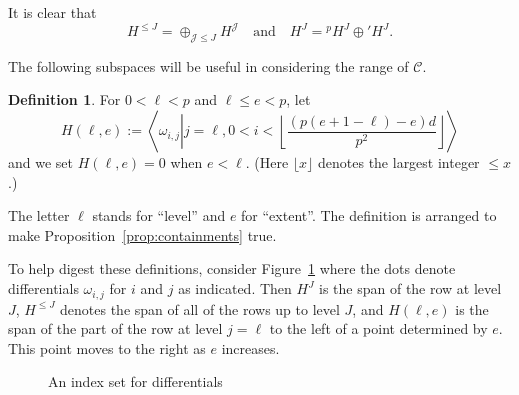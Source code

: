 \documentclass[12pt,reqno]{amsart}
\numberwithin{equation}{section}
\theoremstyle{plain}
\theoremstyle{definition}
\newtheorem{defn}[subsection]{Definition}
\theoremstyle{remark}
\numberwithin{equation}{section}
\newcommand{\CC}{\mathcal{C}}
\newcommand{\<}{\langle}
\renewcommand{\>}{\rangle}
\renewcommand{\and}{\quad\text{and}\quad}
\def\J{\mathcal{J}}
\def\HJ{H^J}
\def\HlJ{H^{\le J}}
\def\prH{{}'H^J}
\def\pH{{}^pH^J}
\begin{document}
It is clear that
\[\HlJ=\oplus_{\J\le J}H^{\J}\and \HJ=\pH\oplus\prH.\]

The following subspaces will be useful in considering the range of
$\CC$.

\begin{defn}\label{def:H(l,e)}
  For $0<\ell<p$ and $\ell\le e<p$, let
\[  H(\ell,e):=\left\<\omega_{i,j}\left|j=\ell,
      0<i<\left\lfloor\frac{(p(e+1-\ell)-e)d}{p^2}\right\rfloor
    \right.\right\>\]
and we set  $H(\ell,e)=0$ when $e<\ell$.   (Here $\lfloor x\rfloor$
denotes the largest integer $\le x$.)
\end{defn}

The letter $\ell$ stands for ``level'' and $e$ for ``extent''.  The
definition is arranged to make Proposition~\ref{prop:containments}
true.



To help digest these definitions, consider Figure~\ref{fig:I}
where the dots denote differentials $\omega_{i,j}$ for $i$ and $j$ as
indicated.  Then $\HJ$ is the span of the row at level $J$, $\HlJ$
denotes the span of all of the rows up to level $J$, and $H(\ell,e)$
is the span of the part of the row at level $j=\ell$ to the left of a
point determined by $e$.  This point moves to the right as $e$
increases.

\begin{figure}
\begin{center}
\end{center}
\caption{An index set for differentials}\label{fig:I}
\end{figure}
\bigskip
\end{document}
